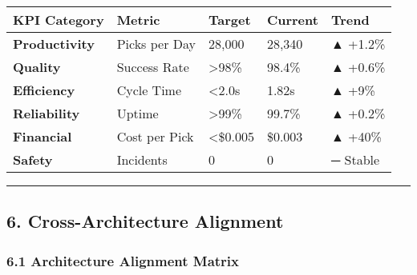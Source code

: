 \documentclass[
]{article}
\begin{document}
\begin{longtable}[]{@{}lllll@{}}
\toprule\noalign{}
\textbf{KPI Category} & \textbf{Metric} & \textbf{Target} &
\textbf{Current} & \textbf{Trend} \\
\midrule\noalign{}
\endhead
\bottomrule\noalign{}
\endlastfoot
\textbf{Productivity} & Picks per Day & 28,000 & 28,340 & ▲ +1.2\% \\
\textbf{Quality} & Success Rate & \textgreater98\% & 98.4\% & ▲
+0.6\% \\
\textbf{Efficiency} & Cycle Time & \textless2.0s & 1.82s & ▲ +9\% \\
\textbf{Reliability} & Uptime & \textgreater99\% & 99.7\% & ▲ +0.2\% \\
\textbf{Financial} & Cost per Pick & \textless\$0.005 & \$0.003 & ▲
+40\% \\
\textbf{Safety} & Incidents & 0 & 0 & ─ Stable \\
\end{longtable}

\begin{center}\rule{0.5\linewidth}{0.5pt}\end{center}

\hypertarget{cross-architecture-alignment}{%
\subsection{6. Cross-Architecture
Alignment}\label{cross-architecture-alignment}}

\hypertarget{architecture-alignment-matrix}{%
\subsubsection{6.1 Architecture Alignment
Matrix}\label{architecture-alignment-matrix}}
\end{document}
